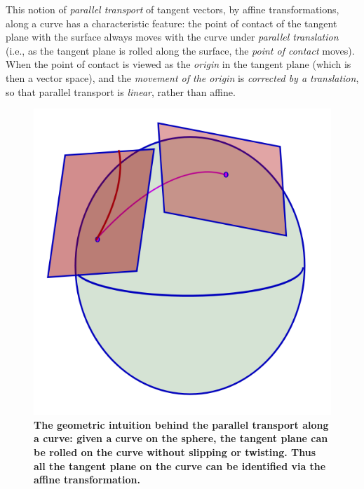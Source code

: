 \documentclass[11pt]{article}
\begin{document}
\begin{enumerate}
This notion of \emph{parallel transport} of tangent vectors, by affine transformations, along a curve has a characteristic feature: the point of contact of the tangent plane with the surface always moves with the curve under \emph{parallel translation} (i.e., as the tangent plane is rolled along the surface, the \emph{point of contact} moves). When the point of contact is viewed as the \emph{origin} in the tangent plane (which is then a vector space), and the \emph{movement of the origin} is \emph{corrected by a translation}, so that parallel transport is \emph{linear}, rather than affine.
\begin{figure}[htb]
\centering
\begin{minipage}{0.6\linewidth}
 \centerline{\includegraphics[scale = 0.32]{Parallel_transport_sphere.png}}
\end{minipage}
\caption{\scriptsize
\textbf{The geometric intuition behind the parallel transport along a curve: given a curve on the sphere, the tangent plane can be rolled on the curve without slipping or twisting.  Thus all the tangent plane on the curve can be identified via the affine transformation. }}\label{fig: parallel_transport_sphere}
\end{figure} \vspace{5pt}


\end{enumerate}
\end{document}
